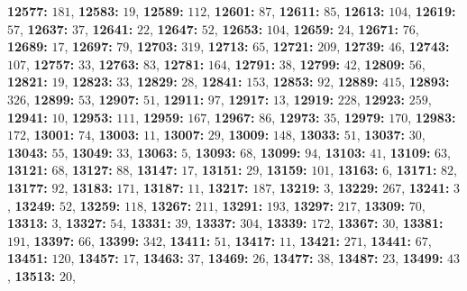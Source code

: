 \textsf{\bfseries 12577:} $181$, \textsf{\bfseries 12583:} $19$, \textsf{\bfseries 12589:} $112$, \textsf{\bfseries 12601:} $87$, \textsf{\bfseries 12611:} $85$, \textsf{\bfseries 12613:} $104$, \textsf{\bfseries 12619:} $57$, \textsf{\bfseries 12637:} $37$, \textsf{\bfseries 12641:} $22$, \textsf{\bfseries 12647:} $52$, \textsf{\bfseries 12653:} $104$, \textsf{\bfseries 12659:} $24$, \textsf{\bfseries 12671:} $76$, \textsf{\bfseries 12689:} $17$, \textsf{\bfseries 12697:} $79$, \textsf{\bfseries 12703:} $319$, \textsf{\bfseries 12713:} $65$, \textsf{\bfseries 12721:} $209$, \textsf{\bfseries 12739:} $46$, \textsf{\bfseries 12743:} $107$, \textsf{\bfseries 12757:} $33$, \textsf{\bfseries 12763:} $83$, \textsf{\bfseries 12781:} $164$, \textsf{\bfseries 12791:} $38$, \textsf{\bfseries 12799:} $42$, \textsf{\bfseries 12809:} $56$, \textsf{\bfseries 12821:} $19$, \textsf{\bfseries 12823:} $33$, \textsf{\bfseries 12829:} $28$, \textsf{\bfseries 12841:} $153$, \textsf{\bfseries 12853:} $92$, \textsf{\bfseries 12889:} $415$, \textsf{\bfseries 12893:} $326$, \textsf{\bfseries 12899:} $53$, \textsf{\bfseries 12907:} $51$, \textsf{\bfseries 12911:} $97$, \textsf{\bfseries 12917:} $13$, \textsf{\bfseries 12919:} $228$, \textsf{\bfseries 12923:} $259$, \textsf{\bfseries 12941:} $10$, \textsf{\bfseries 12953:} $111$, \textsf{\bfseries 12959:} $167$, \textsf{\bfseries 12967:} $86$, \textsf{\bfseries 12973:} $35$, \textsf{\bfseries 12979:} $170$, \textsf{\bfseries 12983:} $172$, \textsf{\bfseries 13001:} $74$, \textsf{\bfseries 13003:} $11$, \textsf{\bfseries 13007:} $29$, \textsf{\bfseries 13009:} $148$, \textsf{\bfseries 13033:} $51$, \textsf{\bfseries 13037:} $30$, \textsf{\bfseries 13043:} $55$, \textsf{\bfseries 13049:} $33$, \textsf{\bfseries 13063:} $5$, \textsf{\bfseries 13093:} $68$, \textsf{\bfseries 13099:} $94$, \textsf{\bfseries 13103:} $41$, \textsf{\bfseries 13109:} $63$, \textsf{\bfseries 13121:} $68$, \textsf{\bfseries 13127:} $88$, \textsf{\bfseries 13147:} $17$, \textsf{\bfseries 13151:} $29$, \textsf{\bfseries 13159:} $101$, \textsf{\bfseries 13163:} $6$, \textsf{\bfseries 13171:} $82$, \textsf{\bfseries 13177:} $92$, \textsf{\bfseries 13183:} $171$, \textsf{\bfseries 13187:} $11$, \textsf{\bfseries 13217:} $187$, \textsf{\bfseries 13219:} $3$, \textsf{\bfseries 13229:} $267$, \textsf{\bfseries 13241:} $3$, \textsf{\bfseries 13249:} $52$, \textsf{\bfseries 13259:} $118$, \textsf{\bfseries 13267:} $211$, \textsf{\bfseries 13291:} $193$, \textsf{\bfseries 13297:} $217$, \textsf{\bfseries 13309:} $70$, \textsf{\bfseries 13313:} $3$, \textsf{\bfseries 13327:} $54$, \textsf{\bfseries 13331:} $39$, \textsf{\bfseries 13337:} $304$, \textsf{\bfseries 13339:} $172$, \textsf{\bfseries 13367:} $30$, \textsf{\bfseries 13381:} $191$, \textsf{\bfseries 13397:} $66$, \textsf{\bfseries 13399:} $342$, \textsf{\bfseries 13411:} $51$, \textsf{\bfseries 13417:} $11$, \textsf{\bfseries 13421:} $271$, \textsf{\bfseries 13441:} $67$, \textsf{\bfseries 13451:} $120$, \textsf{\bfseries 13457:} $17$, \textsf{\bfseries 13463:} $37$, \textsf{\bfseries 13469:} $26$, \textsf{\bfseries 13477:} $38$, \textsf{\bfseries 13487:} $23$, \textsf{\bfseries 13499:} $43$, \textsf{\bfseries 13513:} $20$, 
